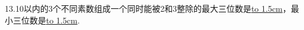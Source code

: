 \question 13.10以内的3个不同素数组成一个同时能被2和3整除的最大三位数是\underline{\hbox to 1.5cm{}}，最小三位数是\underline{\hbox to 1.5cm{}}.